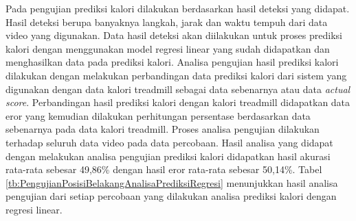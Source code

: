 Pada pengujian prediksi kalori dilakukan berdasarkan hasil deteksi yang didapat. Hasil deteksi berupa banyaknya langkah, jarak dan waktu tempuh dari data video yang digunakan. Data hasil deteksi akan diilakukan untuk proses prediksi kalori dengan menggunakan model regresi linear yang sudah didapatkan dan menghasilkan data pada prediksi kalori. Analisa pengujian hasil prediksi kalori dilakukan dengan melakukan perbandingan data prediksi kalori dari sistem yang digunakan dengan data kalori treadmill sebagai data sebenarnya atau data \emph{actual score}. Perbandingan hasil prediksi kalori dengan kalori treadmill didapatkan data eror yang kemudian dilakukan perhitungan persentase berdasarkan data sebenarnya pada data kalori treadmill. Proses analisa pengujian dilakukan terhadap seluruh data video pada data percobaan. Hasil analisa yang didapat dengan melakukan analisa pengujian prediksi kalori didapatkan hasil akurasi rata-rata sebesar 49,86\% dengan hasil eror rata-rata sebesar 50,14\%. Tabel \ref{tb:PengujianPosisiBelakangAnalisaPrediksiRegresi} menunjukkan hasil analisa pengujian dari setiap percobaan yang dilakukan analisa prediksi kalori dengan regresi linear.

